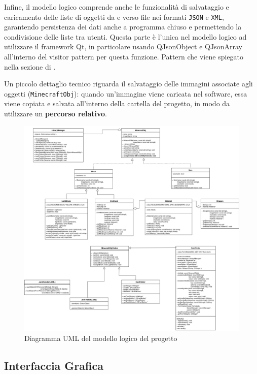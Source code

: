 \documentclass[12pt]{article}
\begin{document}
Infine, il modello logico comprende anche le funzionalità di salvataggio e caricamento delle liste di oggetti da e verso file nei formati \texttt{JSON} e \texttt{XML}, garantendo persistenza dei dati anche a programma chiuso e permettendo la condivisione delle liste tra utenti.
Questa parte è l'unica nel modello logico ad utilizzare il framework Qt, in particolare usando QJsonObject e QJsonArray all'interno del visitor pattern per questa funzione. Pattern che viene spiegato nella sezione di .

\begin{tcolorbox}[colback=gray!10, colframe=black!80!black, title=Nota Bene]
Un piccolo dettaglio tecnico riguarda il salvataggio delle immagini associate agli oggetti (\texttt{MinecraftObj}):  
quando un'immagine viene caricata nel software, essa viene copiata e salvata all’interno della cartella del progetto, in modo da utilizzare un \textbf{percorso relativo}.  
\end{tcolorbox}

\begin{figure}[H]
    \centering
    \includegraphics[width=\textwidth]{res/uml-lattico.png}
    \caption{Diagramma UML del modello logico del progetto}
    \label{fig:uml}
\end{figure}

\subsection{Interfaccia Grafica}
\end{document}
